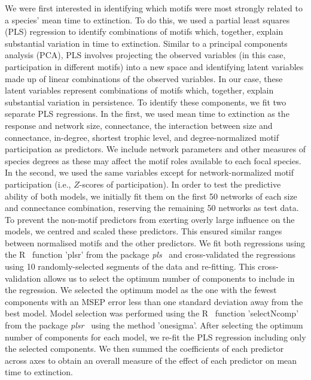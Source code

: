 \documentclass[12pt]{article}
\begin{document}
			We were first interested in identifying which motifs were most strongly related to a species' mean time to extinction. 
			To do this, we used a partial least squares (PLS) regression to identify combinations of motifs which, together, explain substantial variation in time to extinction. 
			Similar to a principal components analysis (PCA), PLS involves projecting the observed variables (in this case, participation in different motifs) into a new space and identifying latent variables made up of linear combinations of the observed variables.
			In our case, these latent variables represent combinations of motifs which, together, explain substantial variation in persistence.
			To identify these components, we fit two separate PLS regressions.
			In the first, we used mean time to extinction as the response and network size, connectance, the interaction between size and connectance, in-degree, shortest trophic level, and degree-normalized motif participation as predictors.
			We include network parameters and other measures of species degrees as these may affect the motif roles available to each focal species.
			In the second, we used the same variables except for network-normalized motif participation (i.e., $Z$-scores of participation).  
			In order to test the predictive ability of both models, we initially fit them on the first 50 networks of each size and connectance combination, reserving the remaining 50 networks as test data.
			To prevent the non-motif predictors from exerting overly large influence on the models, we centred and scaled these predictors. 
			This ensured similar ranges between normalised motifs and the other predictors.
			We fit both regressions using the R~\citep{R} function 'plsr' from the package \emph{pls}~\citep{pls} and cross-validated the regressions using 10 randomly-selected segments of the data and re-fitting.
			This cross-validation allows us to select the optimum number of components to include in the regression.
			We selected the optimum model as the one with the fewest components with an MSEP error less than one standard deviation away from the best model.
			Model selection was performed using the R~\citep{R} function 'selectNcomp' from the package \emph{plsr}~\citep{pls} using the method 'onesigma'.
			After selecting the optimum number of components for each model, we re-fit the PLS regression including only the selected components. 
			We then summed the coefficients of each predictor across axes to obtain an overall measure of the effect of each predictor on mean time to extinction.
\end{document}
